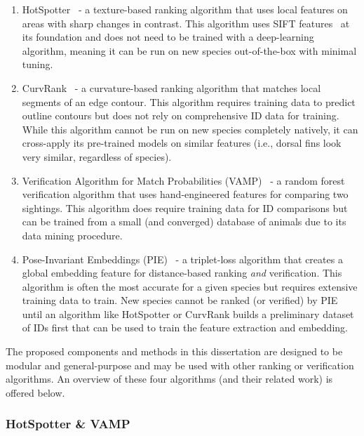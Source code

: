 \begin{enumerate}
    \item HotSpotter~\cite{crall_hotspotter_2013} - a texture-based ranking algorithm that uses local features on areas with sharp changes in contrast.  This algorithm uses SIFT features~\cite{lowe_distinctive_2004} at its foundation and does not need to be trained with a deep-learning algorithm, meaning it can be run on new species out-of-the-box with minimal tuning.
    \item CurvRank~\cite{weideman_extracting_2020} - a curvature-based ranking algorithm that matches local segments of an edge contour.  This algorithm requires training data to predict outline contours but does not rely on comprehensive ID data for training.  While this algorithm cannot be run on new species completely natively, it can cross-apply its pre-trained models on similar features (i.e., dorsal fins look very similar, regardless of species).
    \item Verification Algorithm for Match Probabilities (VAMP)~\cite{crall_identifying_2017} - a random forest verification algorithm that uses hand-engineered features for comparing two sightings.  This algorithm does require training data for ID comparisons but can be trained from a small (and converged) database of animals due to its data mining procedure.
    \item Pose-Invariant Embeddings (PIE)~\cite{moskvyak_robust_2019} - a triplet-loss algorithm that creates a global embedding feature for distance-based ranking \textit{and} verification.  This algorithm is often the most accurate for a given species but requires extensive training data to train.  New species cannot be ranked (or verified) by PIE until an algorithm like HotSpotter or CurvRank builds a preliminary dataset of IDs first that can be used to train the feature extraction and embedding.
\end{enumerate}

\noindent The proposed components and methods in this dissertation are designed to be modular and general-purpose and may be used with other ranking or verification algorithms.  An overview of these four algorithms (and their related work) is offered below.

\subsubsection{HotSpotter \& VAMP}

